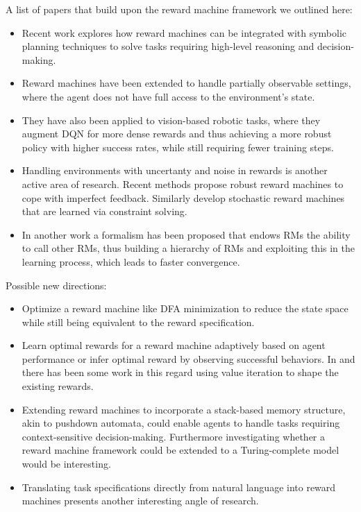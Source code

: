 \documentclass[12pt, a4paper]{article}
\begin{document}
A list of papers that build upon the reward machine framework we outlined here:
\begin{itemize}
	\item Recent work \cite{SP2019} explores how reward machines can be integrated with symbolic planning techniques to solve tasks requiring high-level reasoning and decision-making.
	\item Reward machines have been extended to handle partially observable settings, where the agent does not have full access to the environment's state. \cite{PORL2019}
	\item They have also been applied to vision-based robotic tasks, where they augment DQN for more dense rewards and thus achieving a more robust policy with higher success rates, while still requiring fewer training steps. \cite{Vision2021}
	\item Handling environments with uncertanty and noise in rewards is another active area of research. Recent methods \cite{Noisy2022} propose robust reward machines to cope with imperfect feedback. Similarly \cite{Stochastic2022} develop stochastic reward machines that are learned via constraint solving.
	\item In another work a formalism has been proposed that endows RMs the ability to call other RMs, thus building a hierarchy of RMs and exploiting this in the learning process, which leads to faster convergence. \cite{Hierarchies2023}
\end{itemize}

Possible new directions:
\begin{itemize}
	\item Optimize a reward machine like DFA minimization to reduce the state space while still being equivalent to the reward specification.
	\item Learn optimal rewards for a reward machine adaptively based on agent performance or infer optimal reward by observing successful behaviors. In \cite{LTL2019} and \cite{RM2022} there has been some work in this regard using value iteration to shape the existing rewards.
	\item Extending reward machines to incorporate a stack-based memory structure, akin to pushdown automata, could enable agents to handle tasks requiring context-sensitive decision-making. Furthermore investigating whether a reward machine framework could be extended to a Turing-complete model would be interesting.
	\item Translating task specifications directly from natural language into reward machines presents another interesting angle of research.
\end{itemize}

\printbibliography
\end{document}
